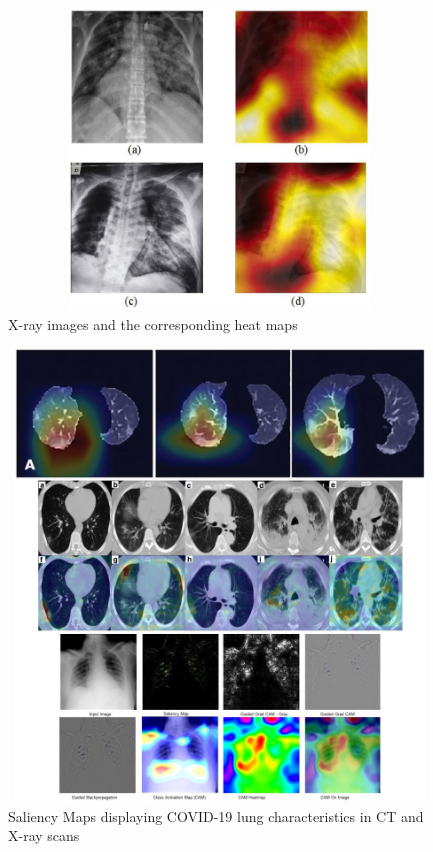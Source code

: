     \begin{figure}[H]
    \centering
    \includegraphics[width=15cm, height=8cm]{Images/Saliency4.JPG}
    \caption[X-ray Heat Map]{X-ray images and the corresponding heat maps \cite{OTY+2020}}
    \label{fig:X-ray images and their corresponding heat maps}
    \end{figure}




\begin{figure}[H]
    \centering
    \includegraphics[width=15.5cm, height=12cm]{Images/Saliency Maps.png}
    \caption[Attention Heat Map]{Saliency Maps displaying COVID-19 lung characteristics in CT and X-ray scans \cite{LLL+2020} \cite{GHT2020} \cite{HSX+2020}}
    \label{fig:Saliency Maps displaying COVID-19 lung characteristics in CT and X-ray scans}
    \end{figure}
    

